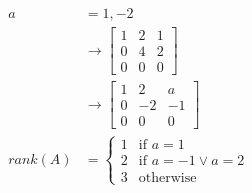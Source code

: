 \documentclass{math}
\begin{document}
\begin{align*}
  a &= 1, -2 \\
  &\to \begin{bmatrix}
    1 & 2 & 1 \\
    0 & 4 & 2 \\
    0 & 0 & 0
  \end{bmatrix} \\
  &\to \begin{bmatrix}
    1 & 2 & a \\
    0 & -2 & -1 \\
    0 & 0 & 0
  \end{bmatrix} \\
  rank(A) &= \begin{cases}
    1 & \text{if } a = 1 \\
    2 & \text{if } a = -1 \vee a = 2 \\
    3 & \text{otherwise}
  \end{cases}
\end{align*}
\end{document}

